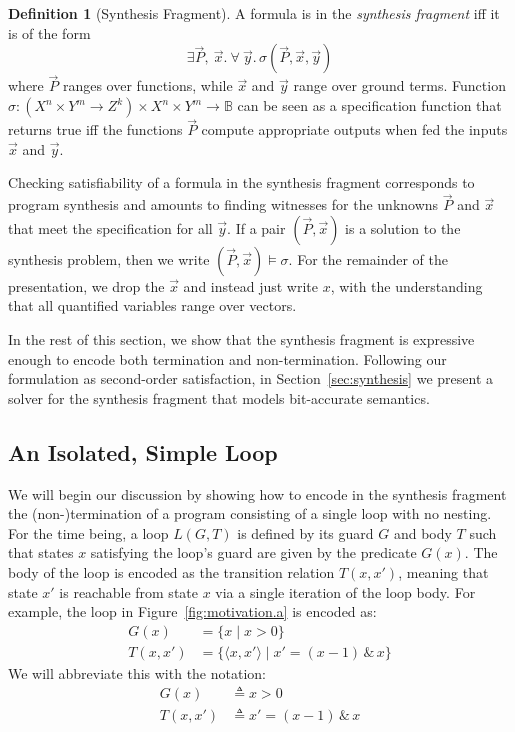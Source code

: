 \documentclass[preprint]{sigplanconf}
\theoremstyle{definition}
\newtheorem{definition}[theorem]{Definition}
\begin{document}
\begin{definition}[Synthesis Fragment]
A formula is in the \emph{synthesis fragment} iff it is of the form
%
 \[
  \exists \vec{P},~ \vec{x} . ~\forall~ \vec{y} .\, \sigma(\vec{P}, \vec{x}, \vec{y})
 \]
%
where $\vec{P}$ ranges over functions, while $\vec{x}$ and $\vec{y}$ range over
ground terms.  Function $\sigma: (X^n \times Y^m \to Z^k) \times X^n \times
Y^m \to \mathbb{B}$ can be seen as a specification function that returns
true iff the functions $\vec{P}$ compute appropriate outputs when fed the
inputs $\vec{x}$ and $\vec{y}$.
%
\end{definition}
%
Checking satisfiability of a formula in the synthesis fragment corresponds to program synthesis and
amounts to finding witnesses for the unknowns $\vec{P}$ and $\vec{x}$ that meet the specification
for all $\vec{y}$. 
If a pair $(\vec{P}, \vec{x})$ is a solution to the synthesis problem, then we write $(\vec{P}, \vec{x}) \models \sigma$.
For the remainder of the presentation, we drop the $\vec{x}$ and instead just write $x$, with the understanding
that all quantified variables range over vectors.

In the rest of this section, we show that the synthesis fragment 
is expressive enough to encode both termination and non-termination. 
Following our formulation as second-order satisfaction, 
in Section~\ref{sec:synthesis} we present a solver for the synthesis fragment that models bit-accurate semantics. 



\subsection{An Isolated, Simple Loop}

We will begin our discussion by showing how to encode in the synthesis fragment the
\mbox{(non-)termination} of a program consisting of a single loop with no nesting.
For the time being, a loop $L(G, T)$ is defined by its guard $G$ and body $T$
such that states $x$ satisfying the loop's guard are given by the
predicate $G(x)$.  The body of the loop is encoded as the transition
relation $T(x, x')$, meaning that state $x'$ is reachable from state $x$ via
a single iteration of the loop body.  For example, the loop in
Figure~\ref{fig:motivation.a} is encoded as:
%
\begin{align*}
G(x) & = \{ x \mid x>0 \} \\
T(x,x') &= \{ \langle x, x' \rangle \mid x' = (x - 1) \, \& \, x \}
\end{align*}
We will abbreviate this with the notation:
\begin{align*}
G(x) & \triangleq x > 0 \\
T(x, x') & \triangleq x' = (x - 1) \, \& \, x
\end{align*}
\end{document}
